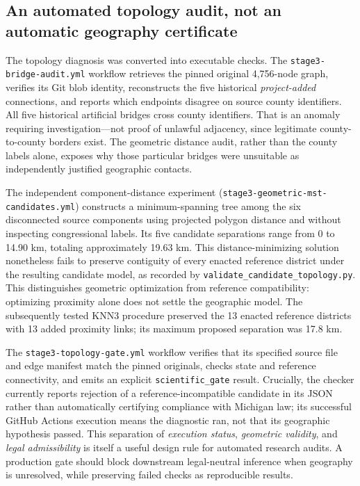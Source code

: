 \documentclass[
  10pt,
]{article}
\begin{document}
\hypertarget{an-automated-topology-audit-not-an-automatic-geography-certificate}{%
\subsection{An automated topology audit, not an automatic geography
certificate}\label{an-automated-topology-audit-not-an-automatic-geography-certificate}}

The topology diagnosis was converted into executable checks. The
\texttt{stage3-bridge-audit.yml} workflow retrieves the pinned original
4,756-node graph, verifies its Git blob identity, reconstructs the five
historical \emph{project-added} connections, and reports which endpoints
disagree on source county identifiers. All five historical artificial
bridges cross county identifiers. That is an anomaly requiring
investigation---not proof of unlawful adjacency, since legitimate
county-to-county borders exist. The geometric distance audit, rather
than the county labels alone, exposes why those particular bridges were
unsuitable as independently justified geographic contacts.

The independent component-distance experiment
(\texttt{stage3-geometric-mst-candidates.yml}) constructs a
minimum-spanning tree among the six disconnected source components using
projected polygon distance and without inspecting congressional labels.
Its five candidate separations range from 0 to 14.90 km, totaling
approximately 19.63 km. This distance-minimizing solution nonetheless
fails to preserve contiguity of every enacted reference district under
the resulting candidate model, as recorded by
\texttt{validate\_candidate\_topology.py}. This distinguishes geometric
optimization from reference compatibility: optimizing proximity alone
does not settle the geographic model. The subsequently tested KNN3
procedure preserved the 13 enacted reference districts with 13 added
proximity links; its maximum proposed separation was 17.8 km.

The \texttt{stage3-topology-gate.yml} workflow verifies that its
specified source file and edge manifest match the pinned originals,
checks state and reference connectivity, and emits an explicit
\texttt{scientific\_gate} result. Crucially, the checker currently
reports rejection of a reference-incompatible candidate in its JSON
rather than automatically certifying compliance with Michigan law; its
successful GitHub Actions execution means the diagnostic ran, not that
its geographic hypothesis passed. This separation of \emph{execution
status}, \emph{geometric validity}, and \emph{legal admissibility} is
itself a useful design rule for automated research audits. A production
gate should block downstream legal-neutral inference when geography is
unresolved, while preserving failed checks as reproducible results.
\end{document}
